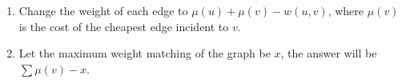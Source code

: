 \begin{itemize}
    \begin{enumerate}

      \item Change the weight of each edge to $\mu(u) + \mu(v) - w(u, v)$, where $\mu(v)$ is the cost of the cheapest edge incident to $v$.
      \item Let the maximum weight matching of the graph be $x$, the answer will be $\sum \mu(v) - x$.
    \end{enumerate}
\end{itemize}
